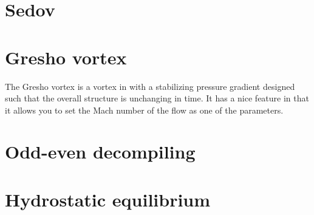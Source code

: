 \section{Sedov}



\section{Gresho vortex}

The Gresho vortex is a vortex in with a stabilizing pressure gradient
designed such that the overall structure is unchanging in time.  It
has a nice feature in that it allows you to set the Mach number of
the flow as one of the parameters.


\section{Odd-even decompiling}


\section{Hydrostatic equilibrium}

